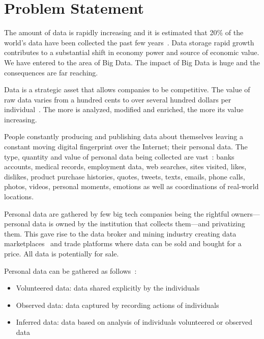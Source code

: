 \chapter{Problem Statement}
\label{problem}

The amount of data is rapidly increasing and it is estimated that 20\% of the world's data have been collected the past
few years~\cite{10.1109/SPW.2015.27,big_data_better_worse}. Data storage rapid growth contributes to a substantial shift in economy power and source of economic value. We have entered to the area of Big Data. The impact of Big Data is huge and the consequences are far reaching.

Data is a strategic asset that allows companies to be competitive. The value of raw data varies from a hundred cents to over several hundred dollars per individual~\cite{pr_data_cost_1, pr_data_cost_2, pr_data_cost_3}. The more is analyzed, modified and enriched, the more its value increasing.

People constantly producing and publishing data about themselves
leaving a constant moving digital fingerprint over the Internet; their personal data. The type, quantity and value of personal data
being collected are vast~\cite{emergence_new_assets_wef}: banks accounts, medical records, employment data, web searches, sites visited,
likes, dislikes, product purchase histories, quotes, tweets, texts, emails, phone calls, photos, videos, personal moments, emotions
as well as coordinations of real-world locations.

Personal data are gathered by few big tech companies being the rightful owners---personal data is owned by the institution that collects them---and privatizing them. This gave rise to the data broker and mining industry creating data marketplaces~\cite{dawex, q_dx, datastreamx} and trade platforms where data can be sold and bought for a price. All data is potentially for sale.

Personal data can be gathered as follows~\cite{emergence_new_assets_wef}:

\begin{itemize}
  \item Volunteered data: data shared explicitly by the individuals
  \item Observed data: data captured by recording actions of individuals
  \item Inferred data: data based on analysis of individuals volunteered or observed data
\end{itemize}

